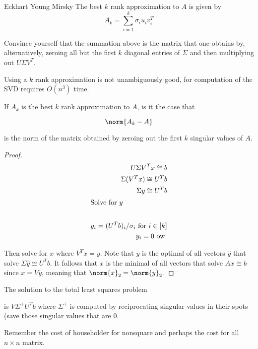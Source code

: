 \documentclass[../main.tex]{subfiles}
\begin{document}
\begin{theorem}{Eckhart Young Mirsky}
   The best $k$ rank approximation to $A$ is given by
   \[
       A_k = \sum_{i=1}^{k}\sigma_{i}u_{i}v_{i}^T
   \]
\end{theorem}
\begin{remark}
       Convince yourself that the summation above is the matrix
       that one obtains by, alternatively, zeroing all but the first
       $k$ diagonal entries of $\Sigma$ and then multiplying out
       $U \Sigma V^T$.
\end{remark}

\begin{remark}
    Using a $k$ rank approximation is not unambiguously good, for computation of the SVD requires $O(n^3)$ time.
\end{remark}

\begin{unresolved}
    If $A_k$ is the best $k$ rank approximation to $A$, is it the case that

    \[
        \norm{A_k - A}
    \]

    is the norm of the matrix obtained by zeroing out the first $k$ singular values of $A$.
\end{unresolved}

\begin{theorem}
    
\end{theorem}
\begin{proof}
    \begin{align*}
        U \Sigma V^T x \cong b \\
        \Sigma (V^Tx) \cong U^T b\\
        \Sigma y \cong U^T b \\
        \intertext{Solve for $y$} \\
        y_i = (U^Tb)_i/\sigma_i \text{ for } i\in [k]\\
        y_i = 0 \text{ ow }\\
    \end{align*}

    Then solve for $x$ where $V^Tx = y$. Note that $y$ is the optimal of all vectors $\hat{y}$ that solve $\Sigma \hat{y} \cong U^Tb$. It follows that $x$ is the minimal of all vectors that solve $Ax \cong b$ since $x = Vy$, meaning that $\norm{x}_2 = \norm{y}_2$.
\end{proof}

\begin{definition}
    The solution to the total least squares problem

    is $V \Sigma^{+} U^T b$ where $\Sigma^{+}$ is computed by reciprocating singular values in their spots (save those singular values that are $0$.
\end{definition}

\begin{remark}
    Remember the cost of householder for nonsquare
    and perhaps the cost for all $n \times n$ matrix.
\end{remark}
\end{document}
